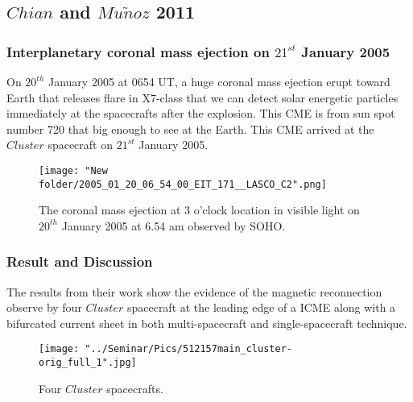 \documentclass[12pt, a4paper]{article}
\begin{document}
		
		\newpage
	
	\subsection*{$Chian$ and $Mu$$\tilde{n}$$oz$ 2011}
		\subsubsection*{Interplanetary coronal mass ejection on $21^{st}$ January 2005}
		On $\text{20}^{th}$ January 2005 at 0654 UT, a huge coronal mass ejection erupt toward Earth that releases flare in X7-class that we can detect solar energetic particles immediately at the spacecrafts after the explosion. This CME is from sun spot number 720 that big enough to see at the Earth. This CME arrived at the $Cluster$ spacecraft on $\text{21}^{st}$ January 2005.
		\begin{figure}[hbtp]
		\centering
		\texttt{[image: "New folder/2005\_01\_20\_06\_54\_00\_EIT\_171\_\_LASCO\_C2".png]}
		\caption{The coronal mass ejection at 3 o'clock location in visible light on $20^{th}$ January 2005 at 6.54 am observed by SOHO.}
		\end{figure}
		\newpage
		\subsubsection*{Result and Discussion}
		The results from their work show the evidence of the magnetic reconnection observe by four $Cluster$ spacecraft at the leading edge of a ICME along with a bifurcated current sheet in both multi-spacecraft and single-spacecraft technique.
		\begin{figure}[h!]
		\centering
		\texttt{[image: "../Seminar/Pics/512157main\_cluster-orig\_full\_1".jpg]}
		\caption{Four $Cluster$ spacecrafts.}
		\end{figure}
		
\end{document}
